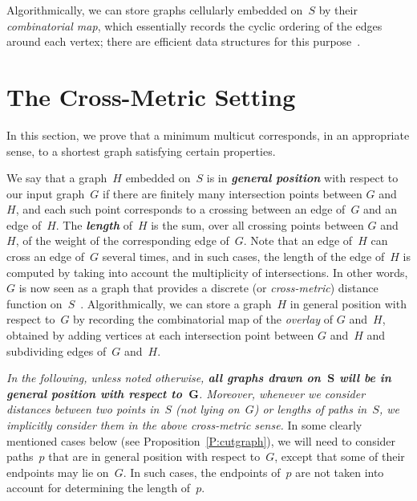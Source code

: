 \documentclass[11pt]{article}
\newcommand{\emphdef}[1]{\textcolor{blueblack}{\textbf{\emph{#1}}}}
\theoremstyle{plain}  \newtheorem{theorem}{Theorem}[section]
\theoremstyle{definition}
\begin{document}
Algorithmically, we can store graphs cellularly embedded on~$S$ by their
\emph{combinatorial map}, which essentially records the cyclic ordering of
the edges around each vertex; there are efficient data structures for this
purpose~\cite{e-dgteg-03,l-gem-82}.

\section{The Cross-Metric Setting}\label{S:cross-metric}

In this section, we prove that a minimum multicut corresponds, in an
appropriate sense, to a shortest graph satisfying certain properties.

We say that a graph~$H$ embedded on~$S$ is in \emphdef{general position}
with respect to our input graph~$G$ if there are finitely many intersection
points between $G$ and~$H$, and each such point corresponds to a crossing
between an edge of~$G$ and an edge of~$H$.  The \emphdef{length} of~$H$ is
the sum, over all crossing points between $G$ and~$H$, of the weight of the
corresponding edge of~$G$.  Note that an edge of~$H$ can cross an edge
of~$G$ several times, and in such cases, the length of the edge of~$H$ is
computed by taking into account the multiplicity of intersections.
In other words, $G$ is now seen as a graph that
provides a discrete (or \emph{cross-metric}) distance function
on~$S$~\cite{ce-tnpcs-10}.  Algorithmically, we can store a graph~$H$ in
general position with respect to~$G$ by recording the combinatorial map of
the \emph{overlay} of $G$ and~$H$, obtained by adding vertices at each
intersection point between $G$ and~$H$ and subdividing edges of~$G$
and~$H$.

\emph{In the following, unless noted otherwise, \textbf{all graphs drawn
    on~$\bm{S}$ will be in general position with respect to~$\bm{G}$}.
  Moreover, whenever we consider distances between two points in~$S$ (not
  lying on~$G$) or lengths of paths in~$S$, we implicitly consider them in
  the above cross-metric sense.}  In some clearly mentioned cases below
(see Proposition~\ref{P:cutgraph}), we will need to consider paths~$p$ that
are in general position with respect to~$G$, except that some of their
endpoints may lie on~$G$.  In such cases, the endpoints of~$p$ are not
taken into account for determining the length of~$p$.
\end{document}
